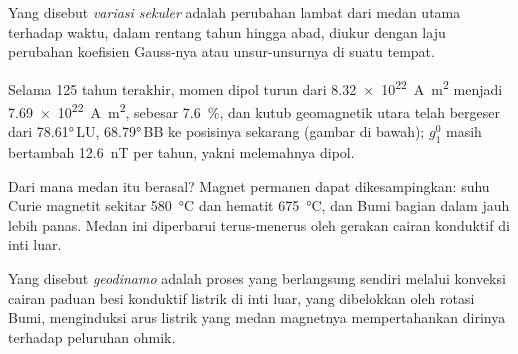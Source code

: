 \begin{definition}\label{def:b3:palaeomagnetism:secular}
Yang disebut \emph{variasi sekuler} adalah perubahan lambat dari
medan utama terhadap waktu, dalam rentang tahun hingga abad, diukur dengan laju perubahan
koefisien Gauss-nya atau unsur-unsurnya di suatu tempat.
\end{definition}

Selama 125 tahun terakhir, momen dipol turun dari
\qty{8.32e22}{A.m^2} menjadi \qty{7.69e22}{A.m^2}, sebesar \qty{7.6}{\percent}, dan
kutub geomagnetik utara telah bergeser dari \ang{78.61}\,LU, \ang{68.79}\,BB ke
posisinya sekarang (gambar di bawah); $g_1^0$ masih bertambah \qty{12.6}{nT} per tahun,
yakni melemahnya dipol.

\begin{omfigure}

\par{}\label{fig:b3:palaeomagnetism:dipole}
\end{omfigure}

Dari mana medan itu berasal? Magnet permanen dapat dikesampingkan: suhu Curie
magnetit sekitar \qty{580}{\celsius} dan hematit
\qty{675}{\celsius}, dan Bumi bagian dalam jauh lebih panas. Medan ini
diperbarui terus-menerus oleh gerakan cairan konduktif
di inti luar.

\begin{definition}[Geodinamo]\label{def:b3:palaeomagnetism:geodynamo}
Yang disebut \emph{geodinamo} adalah proses yang berlangsung sendiri melalui
konveksi cairan paduan besi konduktif listrik di inti luar,
yang dibelokkan oleh rotasi Bumi, menginduksi arus listrik yang medan magnetnya
mempertahankan dirinya terhadap peluruhan ohmik.
\end{definition}

